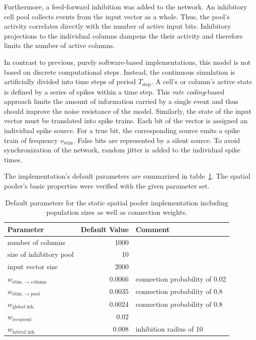 Furthermore, a feed-forward inhibition was added to the network. An inhibitory cell pool collects events from the input vector as a whole. Thus, the pool's activity correlates directly with the number of active input bits. Inhibitory projections to the individual columns dampens the their activity and therefore limits the number of active columns.

In contrast to previous, purely software-based implementations, this model is not based on discrete computational steps. Instead, the continuous simulation is artificially divided into time steps of period $T_\text{step}$. A cell's or column's active state is defined by a series of spikes within a time step. This \emph{rate coding}-based approach limits the amount of information carried by a single event and thus should improve the noise resistance of the model. Similarly, the state of the input vector must be translated into spike trains. Each bit of the vector is assigned an individual spike source. For a true bit, the corresponding source emits a spike train of frequency $\nu_\text{stim}$. False bits are represented by a silent source. To avoid synchronization of the network, random jitter is added to the individual spike times.

The implementation's default parameters are summarized in table~\ref{tab:static_spatial_pooler_defaults}. The spatial pooler's basic properties were verified with the given parameter set.

\begin{table}
	\begin{tabularx}{\textwidth}{lrX}
		\toprule
		Parameter & Default Value & Comment \\
		\midrule
		number of columns & 1000 & \\
		size of inhibitory pool & 10 & \\
		input vector size & 2000 & \\
		\midrule
		$w_\text{stim. → column}$ & 0.0066 & connection probability of 0.02 \\
		$w_\text{stim. → pool}$ & 0.0035 & connection probability of 0.8 \\
		$w_\text{global inh.}$ & 0.0024 & connection probability of 0.8 \\
		$w_\text{recurrent}$ & 0.02 & \\
		$w_\text{lateral inh.}$ & 0.008 & inhibition radius of 10 \\
		\bottomrule
	\end{tabularx}
	\caption{Default parameters for the static spatial pooler implementation including population sizes as well as connection weights.}
	\label{tab:static_spatial_pooler_defaults}
\end{table}

